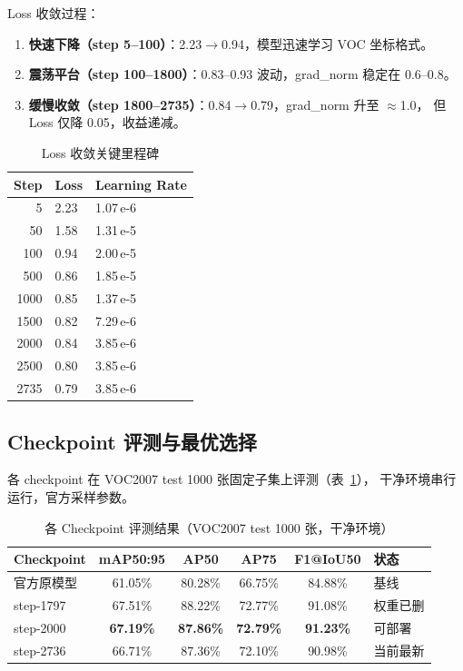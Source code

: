 \documentclass[11pt,a4paper]{article}
\begin{document}
Loss 收敛过程：
\begin{enumerate}
\item \textbf{快速下降（step 5--100）}：2.23$\to$0.94，模型迅速学习 VOC 坐标格式。
\item \textbf{震荡平台（step 100--1800）}：0.83--0.93 波动，grad\_norm 稳定在 0.6--0.8。
\item \textbf{缓慢收敛（step 1800--2735）}：0.84$\to$0.79，grad\_norm 升至 $\approx$1.0，
      但 Loss 仅降 0.05，收益递减。
\end{enumerate}

\begin{table}[H]
\centering\small
\caption{Loss 收敛关键里程碑}
\begin{tabular}{rll}
\toprule
\textbf{Step} & \textbf{Loss} & \textbf{Learning Rate} \\
\midrule
5    & 2.23 & 1.07\,e-6 \\
50   & 1.58 & 1.31\,e-5 \\
100  & 0.94 & 2.00\,e-5 \\
500  & 0.86 & 1.85\,e-5 \\
1000 & 0.85 & 1.37\,e-5 \\
1500 & 0.82 & 7.29\,e-6 \\
2000 & 0.84 & 3.85\,e-6 \\
2500 & 0.80 & 3.85\,e-6 \\
2735 & 0.79 & 3.85\,e-6 \\
\bottomrule
\end{tabular}
\end{table}

\subsection{Checkpoint 评测与最优选择}

各 checkpoint 在 VOC2007 test 1000 张固定子集上评测（表~\ref{tab:ckpt}），
干净环境串行运行，官方采样参数。

\begin{table}[H]
\centering\small
\caption{各 Checkpoint 评测结果（VOC2007 test 1000 张，干净环境）}
\label{tab:ckpt}
\begin{tabularx}{\textwidth}{lccccX}
\toprule
\textbf{Checkpoint} & \textbf{mAP50:95} & \textbf{AP50} & \textbf{AP75} & \textbf{F1@IoU50} & \textbf{状态} \\
\midrule
官方原模型 & 61.05\% & 80.28\% & 66.75\% & 84.88\% & 基线 \\
step-1797  & 67.51\% & 88.22\% & 72.77\% & 91.08\% & 权重已删 \\
step-2000  & \textbf{67.19\%} & \textbf{87.86\%} & \textbf{72.79\%} & \textbf{91.23\%} & 可部署 \\
step-2736  & 66.71\% & 87.36\% & 72.10\% & 90.98\% & 当前最新 \\
\bottomrule
\end{tabularx}
\end{table}
\end{document}
